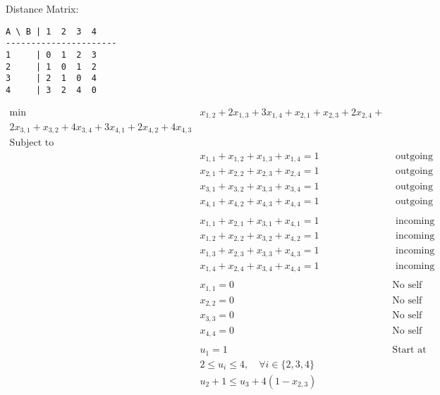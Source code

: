 \documentclass[../open-optimization/open-optimization.tex]{subfiles}
\begin{document}
\begin{example}{}{}

Distance Matrix:
\begin{verbatim}
A \ B | 1  2  3  4
----------------------
1     | 0  1  2  3
2     | 1  0  1  2
3     | 2  1  0  4
4     | 3  2  4  0
\end{verbatim}


\begin{align*}\min\quad & x_{1,2} + 2 x_{1,3} + 3 x_{1,4} + x_{2,1} + x_{2,3} + 2 x_{2,4} + \\ 2 x_{3,1} + x_{3,2} + 4 x_{3,4} + 3 x_{4,1} + 2 x_{4,2} + 4 x_{4,3}\\
\text{Subject to} \quad \\
 & x_{1,1} + x_{1,2} + x_{1,3} + x_{1,4} = 1& \text{ outgoing from node 1}\\
  & x_{2,1} + x_{2,2} + x_{2,3} + x_{2,4} = 1& \text{ outgoing from node 2}\\
 & x_{3,1} + x_{3,2} + x_{3,3} + x_{3,4} = 1& \text{ outgoing from node 3}\\
 & x_{4,1} + x_{4,2} + x_{4,3} + x_{4,4} = 1& \text{ outgoing from node 4}\\
 \\
  & x_{1,1} + x_{2,1} + x_{3,1} + x_{4,1} = 1& \text{ incoming to node 1}\\
 & x_{1,2} + x_{2,2} + x_{3,2} + x_{4,2} = 1& \text{ incoming to node 2}\\
 & x_{1,3} + x_{2,3} + x_{3,3} + x_{4,3} = 1& \text{ incoming to node 3}\\ 
 & x_{1,4} + x_{2,4} + x_{3,4} + x_{4,4} = 1& \text{ incoming to node 4}\\
 \\
 & x_{1,1} = 0 & \text{No self loop with node 1}\\
 & x_{2,2} = 0& \text{No self loop with node 2}\\
 & x_{3,3} = 0& \text{No self loop with node 3}\\
 & x_{4,4} = 0& \text{No self loop with node 4}\\
 \\
 & u_{1} = 1 & \text{Start at node 1}\\
  &2  \leq u_{i} \leq 4, \quad\forall i \in \{2,3,4\}\\
 & u_{2} +1 \leq  u_{3} + 4 (1-x_{2,3})\\

\end{align*}
\end{example}
\end{document}
